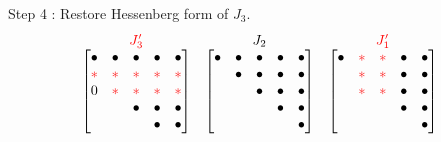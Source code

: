 \begin{frame}
   {\color{green} Step 4} :
   Restore Hessenberg form of $J_3$.
   \[
   \begin{matrix}
     {\color{red} J'_3} & J_2 &  {\color{red} J'_1} \\
     \begin{bmatrix}
       \uch & \uch & \uch & \uch & \uch \\
       \ch & \ch & \ch & \ch & \ch \\
       0 & \ch & \ch & \ch & \ch \\
       & & \uch & \uch & \uch \\
       & & & \uch & \uch \\
     \end{bmatrix}
     &
     \begin{bmatrix}
       \uch & \uch & \uch & \uch & \uch \\
        & \uch & \uch & \uch & \uch \\
       & & \uch & \uch & \uch \\
       & & & \uch & \uch \\
       & & & & \uch \\
     \end{bmatrix}
     &
     \begin{bmatrix}
       \uch & \ch & \ch & \uch & \uch \\
        & \ch & \ch & \uch & \uch \\
       & \ch & \ch & \uch & \uch \\
       & & & \uch & \uch \\
       & & & & \uch \\
     \end{bmatrix}
   \end{matrix}
   \]
 \end{frame}

